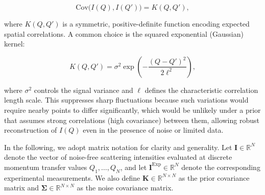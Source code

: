 \documentclass[12pt]{article}
\begin{document}
\begin{equation}
    \mathrm{Cov}\big(I(Q), I(Q')\big) = K(Q, Q'),
\end{equation}

where \( K(Q, Q') \) is a symmetric, positive-definite function encoding expected spatial correlations. A common choice is the squared exponential (Gaussian) kernel:

\begin{equation}
    K(Q, Q') = \sigma^2 \exp\left( -\frac{(Q - Q')^2}{2\ell^2} \right),
\end{equation}

where \( \sigma^2 \) controls the signal variance and \( \ell \) defines the characteristic correlation length scale. This suppresses sharp fluctuations because such variations would require nearby points to differ significantly, which would be unlikely under a prior that assumes strong correlations (high covariance) between them, allowing robust reconstruction of \( I(Q) \) even in the presence of noise or limited data. 

In the following, we adopt matrix notation for clarity and generality. Let \( \mathbf{I} \in \mathbb{R}^N \) denote the vector of noise-free scattering intensities evaluated at discrete momentum transfer values \( Q_1, \dots, Q_N \), and let \( \mathbf{I}^{\mathrm{Exp}} \in \mathbb{R}^N \) denote the corresponding experimental measurements. We also define \( \mathbf{K} \in \mathbb{R}^{N \times N} \) as the prior covariance matrix and \( \boldsymbol{\Sigma} \in \mathbb{R}^{N \times N} \) as the noise covariance matrix.
\end{document}
